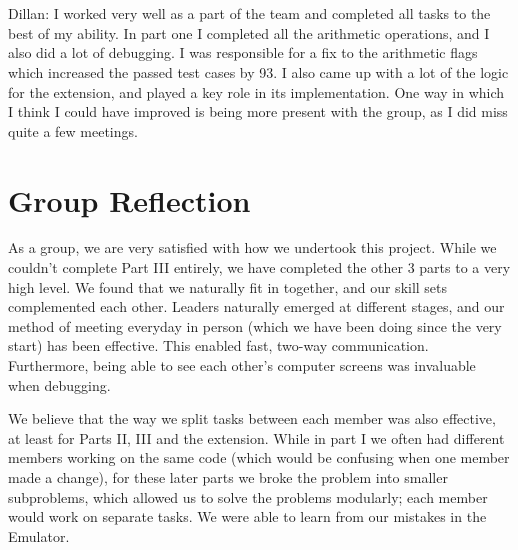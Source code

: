 \documentclass[11pt]{article}
\begin{document}
\\
\\
Dillan:
I worked very well as a part of the team and completed all tasks to the best of my ability. In part one I completed all the arithmetic operations, and I also did a lot of debugging. I was responsible for a fix to the arithmetic flags which increased the passed test cases by 93. I also came up with a lot of the logic for the extension, and played a key role in its implementation. One way in which I think I could have improved is being more present with the group, as I did miss quite a few meetings.


\section{Group Reflection}
As a group, we are very satisfied with how we undertook this project. While we couldn’t complete Part III entirely,  we have completed the other 3 parts to a very high level. We found that we naturally fit in together, and our skill sets complemented each other. Leaders naturally emerged at different stages, and our method of meeting everyday in person (which we have been doing since the very start) has been effective. This enabled fast, two-way communication. Furthermore, being able to see each other’s computer screens was invaluable when debugging. 

We believe that the way we split tasks between each member was also effective, at least for Parts II, III and the extension. While in part I we often had different members working on the same code (which would be confusing when one member made a change), for these later parts we broke the problem into smaller subproblems, which allowed us to solve the problems modularly; each member would work on separate tasks. We were able to learn from our mistakes in the Emulator.
\end{document}
